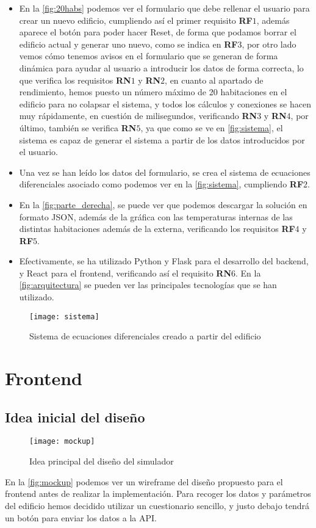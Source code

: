 \begin{itemize}
	\item En la \autoref{fig:20habs} podemos ver el formulario que debe rellenar el usuario para crear un nuevo edificio, cumpliendo así el primer requisito \textbf{RF}$1$, además aparece el botón para poder hacer Reset, de forma que podamos borrar el edificio actual y generar uno nuevo, como se indica en \textbf{RF}$3$, por otro lado vemos cómo tenemos avisos en el formulario que se generan de forma dinámica para ayudar al usuario a introducir los datos de forma correcta, lo que verifica los requisitos \textbf{RN}$1$ y \textbf{RN}$2$, en cuanto al apartado de rendimiento, hemos puesto un número máximo de 20 habitaciones en el edificio para no colapsar el sistema, y todos los cálculos y conexiones se hacen muy rápidamente, en cuestión de milisegundos, verificando \textbf{RN}$3$ y \textbf{RN}$4$, por último, también se verifica \textbf{RN}$5$, ya que como se ve en \autoref{fig:sistema}, el sistema es capaz de generar el sistema a partir de los datos introducidos por el usuario.
	\item Una vez se han leído los datos del formulario, se crea el sistema de ecuaciones diferenciales asociado como podemos ver en la \autoref{fig:sistema}, cumpliendo \textbf{RF}$2$.
	\item En la \autoref{fig:parte_derecha}, se puede ver que podemos descargar la solución en formato JSON, además de la gráfica con las temperaturas internas de las distintas habitaciones además de la externa, verificando los requisitos \textbf{RF}$4$ y \textbf{RF}$5$.
	\item Efectivamente, se ha utilizado Python y Flask para el desarrollo del backend, y React para el frontend, verificando así el requisito \textbf{RN$6$}. En la \autoref{fig:arquitectura} se pueden ver las principales tecnologías que se han utilizado.
\end{itemize}

\begin{figure}[h!]
	\centering
	\texttt{[image: sistema]}
	\caption{Sistema de ecuaciones diferenciales creado a partir del edificio}
	\label{fig:sistema}
\end{figure}

\section{Frontend}
\subsection{Idea inicial del diseño}
\begin{figure}[h!]
	\centering
	\texttt{[image: mockup]}
	\caption{Idea principal del diseño del simulador}
	\label{fig:mockup}
\end{figure}
En la \autoref{fig:mockup} podemos ver un wireframe del diseño propuesto para el frontend antes de realizar la implementación. Para recoger los datos y parámetros del edificio hemos decidido utilizar un cuestionario sencillo, y justo debajo tendrá un botón para enviar los datos a la API.

